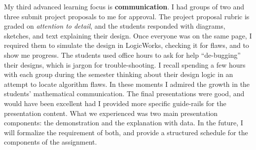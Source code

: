 \documentclass[../../../main.tex]{subfiles}
\begin{document}
My third advanced learning focus is \textbf{communication}.  I had groups of two and three submit project proposals to me for approval.  The project proposal rubric is graded on \textit{attention to detail}, and the students responded with diagrams, sketches, and text explaining their design.  Once everyone was on the same page, I required them to simulate the design in LogicWorks, checking it for flaws, and to show me progress.  The students used office hours to ask for help ``de-bugging'' their designs, which is jargon for trouble-shooting.  I recall spending a few hours with each group during the semester thinking about their design logic in an attempt to locate algorithm flaws.  In these moments I admired the growth in the students' mathematical communication.  The final presentations were good, and would have been excellent had I provided more specific guide-rails for the presentation content.  What we experienced was two main presentation components: the demonstration and the explanation with data.  In the future, I will formalize the requirement of both, and provide a structured schedule for the components of the assignment. \\ \hspace{0.1cm}
\end{document}
